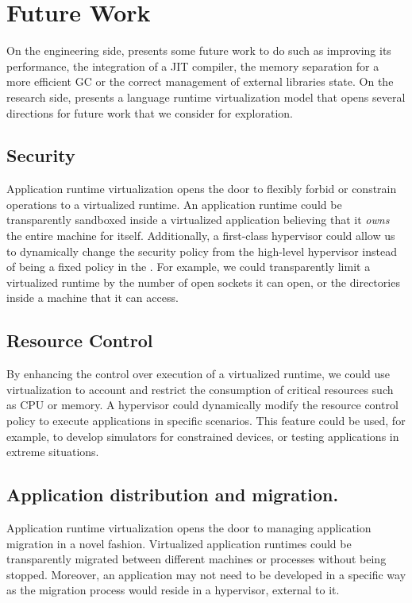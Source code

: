 \section{Future Work}

On the engineering side, \Vtt presents some future work to do such as improving its performance, the integration of a JIT compiler, the memory separation for a more efficient GC or the correct management of external libraries state. On the research side, \Vtt presents a language runtime virtualization model that opens several directions for future work that we consider for exploration.

\subsection{Security} Application runtime virtualization opens the door to flexibly forbid or constrain operations to a virtualized runtime. An application runtime could be transparently sandboxed inside a virtualized application believing that it \emph{owns} the entire machine for itself. Additionally, a first-class hypervisor could allow us to dynamically change the security policy from the high-level hypervisor instead of being a fixed policy in the \VM. For example, we could transparently limit a virtualized runtime by the number of open sockets it can open, or the directories inside a machine that it can access.

\subsection{Resource Control} By enhancing the control over execution of a virtualized runtime, we could use virtualization to account and restrict the consumption of critical resources such as CPU or memory. A hypervisor could dynamically modify the resource control policy to execute applications in specific scenarios. This feature could be used, for example, to develop simulators for constrained devices, or testing applications in extreme situations.

\subsection{Application distribution and migration.} Application runtime virtualization opens the door to managing application migration in a novel fashion. Virtualized application runtimes could be transparently migrated between different machines or processes without being stopped. Moreover, an application may not need to be developed in a specific way as the migration process would reside in a hypervisor, external to it.

